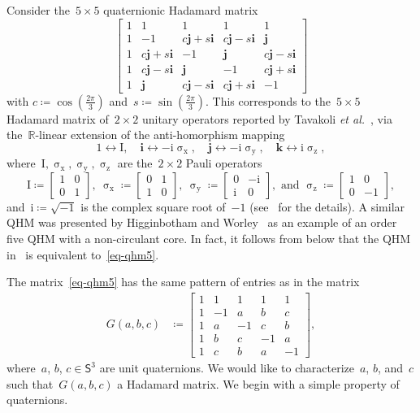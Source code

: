 \documentclass[12pt]{article}
\numberwithin{equation}{section}
\newcommand{\qi}{\mathbf{i}}
\newcommand{\qj}{\mathbf{j}}
\newcommand{\qk}{\mathbf{k}}
\newcommand{\reals}{{\mathbb R}}
\newcommand{\eqdef}{\coloneqq}
\newcommand{\complexi}{{\mathrm{i}}}
\newcommand{\id}{{\mathrm I}}
\newcommand{\qsphere}{{\mathsf S}}
\newcommand{\PauliX}{\upsigma_{\mathrm{x}}}
\newcommand{\PauliY}{\upsigma_{\mathrm{y}}}
\newcommand{\PauliZ}{\upsigma_{\mathrm{z}}}
\begin{document}
Consider the~$5 \times 5$ quaternionic Hadamard matrix
\begin{equation}
\label{eq-qhm5}
\begin{bmatrix}
1 &1  &1  &1  &1  \\
1 &-1  &c\qj+s\qi  &c\qj-s\qi  &\qj  \\
1 &c\qj+s\qi  &-1  &\qj  &c\qj-s\qi  \\
1 &c\qj-s\qi  &\qj  &-1  &c\qj+s\qi  \\
1 &\qj  &c\qj-s\qi  &c\qj+s\qi  &-1 
\end{bmatrix}
\end{equation}
with $c \eqdef \cos(\frac{2\pi}3)$ and~$s \eqdef \sin(\frac{2\pi}3)$. This corresponds to the~$5 \times 5$ Hadamard matrix of~$2 \times 2$ unitary operators reported by Tavakoli \textit{et al.\/}~\cite{TFR+21-mubs}, via the~$\reals$-linear extension of the anti-homorphism mapping
\begin{equation}
\label{eq:isometry}
1 \leftrightarrow \id, \quad \qi \leftrightarrow -\complexi \PauliX, \quad \qj \leftrightarrow -\complexi \PauliY, \quad \qk \leftrightarrow \complexi \PauliZ,
\end{equation}
where~$\id, \PauliX,\PauliY,\PauliZ$ are the~$2 \times 2$ Pauli operators
\[
\id \eqdef 
\begin{bmatrix}
    1 & 0 \\
    0 & 1
\end{bmatrix}, \ 
\PauliX \eqdef 
\begin{bmatrix}
    0 & 1 \\
    1 & 0
\end{bmatrix}, \ 
\PauliY \eqdef 
\begin{bmatrix}
    0 & -\complexi \\
    \complexi & 0
\end{bmatrix},
\text{ and } 
\PauliZ \eqdef 
\begin{bmatrix}
    1 & 0 \\
    0 & -1
\end{bmatrix},
\]
and~$\complexi \eqdef \sqrt{-1}$ is the complex square root of~$-1$ (see~\cite[Section~II.D]{FKN23-mum-superdense-coding} for the details).
A similar QHM was presented by Higginbotham and Worley~\cite[Example~3]{HW22-qhm} as an example of an order five QHM with a non-circulant core.
In fact, it follows from \Cref{thm-gabc-characterization} below that the QHM in~\cite[Example~3]{HW22-qhm} is equivalent to~\eqref{eq-qhm5}.

The matrix~\eqref{eq-qhm5} has the same pattern of entries as in the matrix
\begin{align}
\label{eq-form1}
G(a,b,c) & \eqdef
\begin{bmatrix}
1 &1  &1  &1  &1  \\
1 &-1  &a  &b  &c  \\
1 &a  &-1  &c  &b  \\
1 &b  &c  &-1  &a  \\
1 &c  &b  &a  &-1 
\end{bmatrix},
\end{align}
where~$a$, $b$, $c \in \qsphere^3$ are unit quaternions.
We would like to characterize~$a$, $b$, and~$c$ such that~$G(a,b,c)$ a Hadamard matrix.
We begin with a simple property of quaternions.
\end{document}

